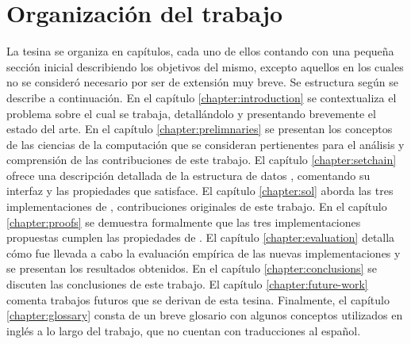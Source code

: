   \section{Organización del trabajo}
  La tesina se organiza en capítulos, cada uno de ellos contando con una pequeña sección inicial
  describiendo los objetivos del mismo, excepto aquellos en los cuales no se consideró necesario por
  ser de extensión muy breve.
  Se estructura según se describe a continuación.
  En el capítulo \ref{chapter:introduction} se
  contextualiza el problema sobre el cual se trabaja, detallándolo y presentando brevemente
  el estado del arte.
  En el capítulo \ref{chapter:prelimnaries} se presentan los conceptos de las ciencias de la computación que se
  consideran pertienentes para el análisis y comprensión de las contribuciones de este trabajo.
  El capítulo \ref{chapter:setchain} ofrece una descripción detallada de la estructura de datos \setchain,
  comentando su interfaz y las propiedades que satisface.
  El capítulo \ref{chapter:sol} aborda las tres implementaciones de \setchain, contribuciones originales
  de este trabajo.
  En el capítulo \ref{chapter:proofs} se demuestra formalmente que las tres implementaciones propuestas
  cumplen las propiedades de \setchain.
  El capítulo \ref{chapter:evaluation} detalla cómo fue llevada a cabo la evaluación empírica de las
  nuevas implementaciones y se presentan los resultados obtenidos.
  En el capítulo \ref{chapter:conclusions} se discuten las conclusiones de este trabajo.
  El capítulo \ref{chapter:future-work} comenta trabajos futuros que se derivan de esta tesina.
  Finalmente, el capítulo \ref{chapter:glossary} consta de un breve glosario con algunos conceptos
  utilizados en inglés a lo largo del trabajo, que no cuentan con traducciones al español.

